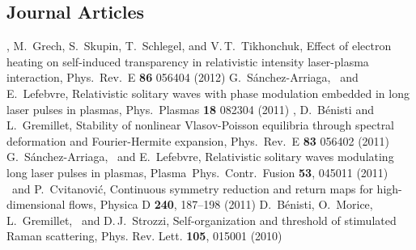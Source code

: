 \subsection{Journal Articles}
	{\siminos, M.~Grech, S.~Skupin, T.~Schlegel, and V.\,T.~Tikhonchuk,
	{\emtitle Effect of electron heating on self-induced transparency in relativistic intensity laser-plasma interaction},
	{\emjournal Phys.~Rev.~E}  \textbf{86} 056404 (2012) %
	}
	{G.~S\'anchez-Arriaga, \siminos\ and E.~Lefebvre,
	{\emtitle Relativistic solitary waves with phase modulation embedded in long laser pulses in plasmas,}
	{\emjournal Phys.~Plasmas} \textbf{18} 082304 (2011) %
	}
	{\siminos, D.~B\'enisti and L.~Gremillet,
	{\emtitle Stability of nonlinear Vlasov-Poisson equilibria through spectral deformation and Fourier-Hermite expansion,}
	{\emjournal Phys.~Rev.~E} \textbf{83} 056402 (2011) %
	}
	{G.~S\'anchez-Arriaga, \siminos\ and E.~Lefebvre,
	{\emtitle Relativistic solitary waves modulating long laser pulses in plasmas,}
	{\emjournal Plasma~Phys.~Contr.~Fusion} \textbf{53}, 045011 (2011)%
	}
	{\siminos\ and  P.~Cvitanovi\'c,
 	{\emtitle Continuous symmetry reduction and return maps for high-dimensional flows,}
 	{\emjournal Physica D} \textbf{240}, 187--198 (2011)
	}
	{D.~B\'enisti, O.~Morice, L.~Gremillet, \siminos\ and D.\,J.~Strozzi,
	{\emtitle Self-organization and threshold of stimulated Raman scattering,}
	{\emjournal Phys. Rev. Lett.} \textbf{105}, 015001 (2010)
	}
